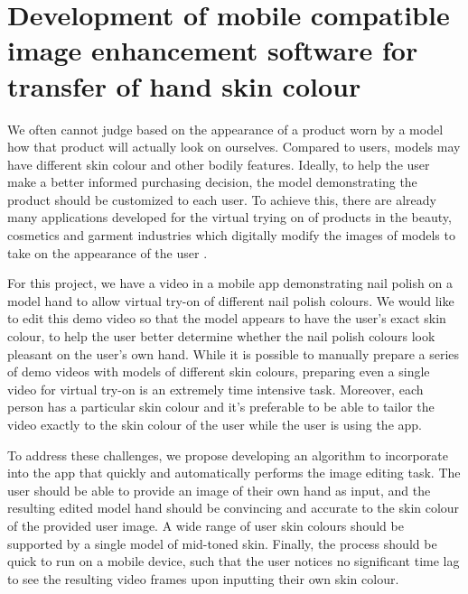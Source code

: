 \documentclass[12pt, a4paper]{article}
\begin{document}
\section*{Development of mobile compatible image enhancement software for transfer of hand skin colour}

We often cannot judge based on the appearance of a product worn by a model how that product will actually look on ourselves. Compared to users, models may have different skin colour and other bodily features. Ideally, to help the user make a better informed purchasing decision, the model demonstrating the product should be customized to each user. To achieve this, there are already many applications developed for the virtual trying on of products in the beauty, cosmetics and garment industries which digitally modify the images of models to take on the appearance of the user \cite{zhang_2017_try} \cite{shilkrot_2013_garment, li_2015_replace}.

For this project, we have a video in a mobile app demonstrating nail polish on a model hand to allow virtual try-on of different nail polish colours. We would like to edit this demo video so that the model appears to have the user's exact skin colour, to help the user better determine whether the nail polish colours look pleasant on the user's own hand. While it is possible to manually prepare a series of demo videos with models of different skin colours, preparing even a single video for virtual try-on is an extremely time intensive task. Moreover, each person has a particular skin colour and it's preferable to be able to tailor the video exactly to the skin colour of the user while the user is using the app.

To address these challenges, we propose developing an algorithm to incorporate into the app that quickly and automatically performs the image editing task. The user should be able to provide an image of their own hand as input, and the resulting edited model hand should be convincing and accurate to the skin colour of the provided user image. A wide range of user skin colours should be supported by a single model of mid-toned skin. Finally, the process should be quick to run on a mobile device, such that the user notices no significant time lag to see the resulting video frames upon inputting their own skin colour.
\end{document}
